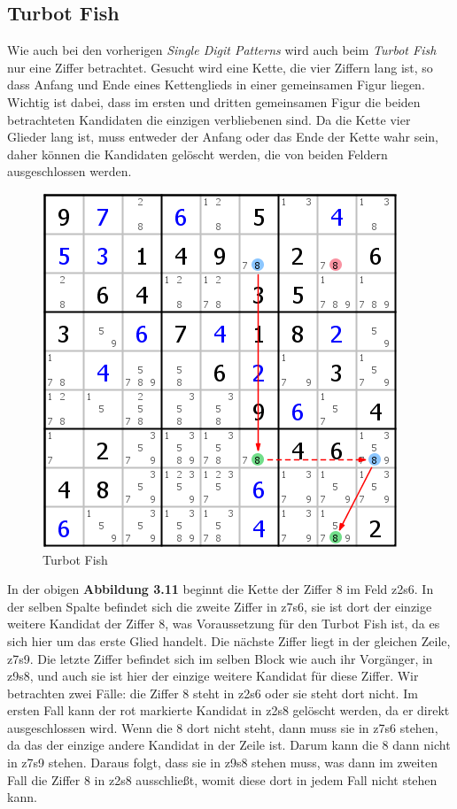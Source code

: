 \documentclass[accentcolor=tud6b,11pt,paper=a4]{tudreport}
\begin{document}
\newpage
\subsection{Turbot Fish}
Wie auch bei den vorherigen \textit{Single Digit Patterns} wird auch beim \textit{Turbot Fish} nur eine Ziffer betrachtet. Gesucht wird eine Kette, die vier Ziffern lang ist, so dass Anfang und Ende eines Kettenglieds in einer gemeinsamen Figur liegen. Wichtig ist dabei, dass im ersten und dritten gemeinsamen Figur die beiden betrachteten Kandidaten die einzigen verbliebenen  sind. Da die Kette vier Glieder lang ist, muss entweder der Anfang oder das Ende der Kette wahr sein, daher können die Kandidaten gelöscht werden, die von beiden Feldern ausgeschlossen werden.

\begin{figure}[h]
\begin{center}
\includegraphics{./img/turbot_fish.png}
\caption{Turbot Fish}
\end{center}
\end{figure}

In der obigen \textbf{Abbildung 3.11} beginnt die Kette der Ziffer 8 im Feld z2s6. In der selben Spalte befindet sich die zweite Ziffer in z7s6, sie ist dort der einzige weitere Kandidat der Ziffer 8, was Voraussetzung für den Turbot Fish ist, da es sich hier um das erste Glied handelt. Die nächste Ziffer liegt in der gleichen Zeile, z7s9. Die letzte Ziffer befindet sich im selben Block wie auch ihr Vorgänger, in z9s8, und auch sie ist hier der einzige weitere Kandidat für diese Ziffer. Wir betrachten zwei Fälle: die Ziffer 8 steht in z2s6 oder sie steht dort nicht. Im ersten Fall kann der rot markierte Kandidat in z2s8 gelöscht werden, da er direkt ausgeschlossen wird. Wenn die 8 dort nicht steht, dann muss sie in z7s6 stehen, da das der einzige andere Kandidat in der Zeile ist. Darum kann die 8 dann nicht in z7s9 stehen. Daraus folgt, dass sie in z9s8 stehen muss, was dann im zweiten Fall die Ziffer 8 in z2s8 ausschließt, womit diese dort in jedem Fall nicht stehen kann.
\end{document}
